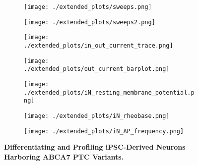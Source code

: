 \begin{figure}[H]
    \begin{subfigure}[t]{0.33\textwidth}
        \caption{}
        \texttt{[image: ./extended\_plots/sweeps.png]}        
    \end{subfigure}   
    \begin{subfigure}[t]{0.2\textwidth}
        \caption{}
        \texttt{[image: ./extended\_plots/sweeps2.png]}        
    \end{subfigure}   
    \begin{subfigure}[t]{0.33\textwidth}
        \caption{}
        \texttt{[image: ./extended\_plots/in\_out\_current\_trace.png]}        
    \end{subfigure}  
    \begin{subfigure}[t]{0.33\textwidth}
        \caption{}
        \texttt{[image: ./extended\_plots/out\_current\_barplot.png]}        
    \end{subfigure}  
    \begin{subfigure}[t]{0.25\textwidth}
        \caption{}
        \texttt{[image: ./extended\_plots/iN\_resting\_membrane\_potential.png]}        
    \end{subfigure}  
    \begin{subfigure}[t]{0.25\textwidth}
        \caption{}
        \texttt{[image: ./extended\_plots/iN\_rheobase.png]}        
    \end{subfigure} 
    \hspace{1cm}
    \begin{subfigure}[t]{0.4\textwidth}
        \caption{}
        \texttt{[image: ./extended\_plots/iN\_AP\_frequency.png]}        
    \end{subfigure}  
    \caption{
        \textbf{Differentiating and Profiling iPSC-Derived Neurons Harboring ABCA7 PTC Variants.}\\
    }
    \label{fig:differentiating_iPSC_neurons}
\end{figure}
